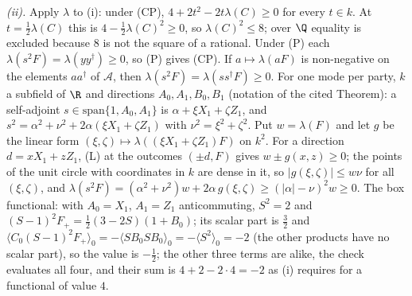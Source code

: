 \emph{(ii).} Apply $\lambda$ to (i): under (CP), $4 + 2t^{2} - 2t\lambda(C) \ge 0$ for every $t \in k$. At $t = \tfrac12\lambda(C)$ this is $4 - \tfrac12\lambda(C)^{2} \ge 0$, so $\lambda(C)^{2} \le 8$; over $\Q$ equality is excluded because $8$ is not the square of a rational. Under (P) each $\lambda(s^{2}F) = \lambda(yy^{\dagger}) \ge 0$, so (P) gives (CP). If $a \mapsto \lambda(aF)$ is non-negative on the elements $aa^{\dagger}$ of $\mathcal{A}$, then $\lambda(s^{2}F) = \lambda(ss^{\dagger}F) \ge 0$. For one mode per party, $k$ a subfield of $\R$ and directions $A_{0}, A_{1}, B_{0}, B_{1}$ (notation of the cited Theorem): a self-adjoint $s \in \mathrm{span}\{1, A_{0}, A_{1}\}$ is $\alpha + \xi X_{1} + \zeta Z_{1}$, and $s^{2} = \alpha^{2} + \nu^{2} + 2\alpha(\xi X_{1} + \zeta Z_{1})$ with $\nu^{2} = \xi^{2} + \zeta^{2}$. Put $w = \lambda(F)$ and let $g$ be the linear form $(\xi, \zeta) \mapsto \lambda((\xi X_{1} + \zeta Z_{1})F)$ on $k^{2}$. For a direction $d = xX_{1} + zZ_{1}$, (L) at the outcomes $(\pm d, F)$ gives $w \pm g(x,z) \ge 0$; the points of the unit circle with coordinates in $k$ are dense in it, so $|g(\xi,\zeta)| \le w\nu$ for all $(\xi,\zeta)$, and $\lambda(s^{2}F) = (\alpha^{2} + \nu^{2})w + 2\alpha\,g(\xi,\zeta) \ge (|\alpha| - \nu)^{2}w \ge 0$. The box functional: with $A_{0} = X_{1}$, $A_{1} = Z_{1}$ anticommuting, $S^{2} = 2$ and $(S - 1)^{2}F_{+} = \tfrac12(3 - 2S)(1 + B_{0})$; its scalar part is $\tfrac32$ and $\langle C_{0}(S - 1)^{2}F_{+}\rangle_{0} = -\langle SB_{0}SB_{0}\rangle_{0} = -\langle S^{2}\rangle_{0} = -2$ (the other products have no scalar part), so the value is $-\tfrac12$; the other three terms are alike, the check evaluates all four, and their sum is $4 + 2 - 2\cdot 4 = -2$ as (i) requires for a functional of value $4$.

